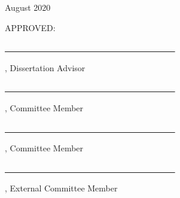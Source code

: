 \documentclass[12pt, oneside]{book} %
\newcommand\BackgroundPic{%
\put(-250,-160){%
\parbox[b][\paperheight]{\paperwidth}{%
\vfill
\centering
\vfill
}}}
\begin{document}
\begin{titlepage}
\begin{center}
\vspace{0.2cm}

August 2020

\end{center}

\vspace{1.0cm}

APPROVED:

\vspace{0.3cm}

\underline{\textcolor{white}{-------------------------------------------------------------}}

\vspace{-0.2cm}

, Dissertation Advisor

\vspace{0.2cm}

\underline{\textcolor{white}{-------------------------------------------------------------}}

\vspace{-0.2cm}

, Committee Member

\vspace{0.2cm}

\underline{\textcolor{white}{-------------------------------------------------------------}}

\vspace{-0.2cm}

, Committee Member

\vspace{0.2cm}

\underline{\textcolor{white}{-------------------------------------------------------------}}

\vspace{-0.2cm}

, External Committee Member

\end{titlepage}
\end{document}
